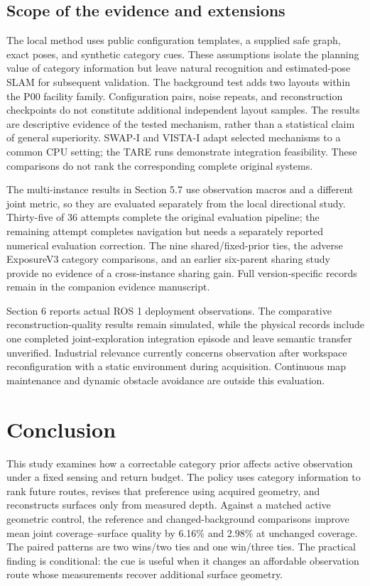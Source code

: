 \documentclass[11pt,a4paper]{article}
\providecommand{\hypertarget}[2]{#2}
\begin{document}
\hypertarget{scope-of-the-evidence-and-extensions}{%
\subsection{Scope of the evidence and extensions}\label{scope-of-the-evidence-and-extensions}}

The local method uses public configuration templates, a supplied safe graph, exact poses, and synthetic category cues. These assumptions isolate the planning value of category information but leave natural recognition and estimated-pose SLAM for subsequent validation. The background test adds two layouts within the P00 facility family. Configuration pairs, noise repeats, and reconstruction checkpoints do not constitute additional independent layout samples. The results are descriptive evidence of the tested mechanism, rather than a statistical claim of general superiority. SWAP-I and VISTA-I adapt selected mechanisms to a common CPU setting; the TARE runs demonstrate integration feasibility. These comparisons do not rank the corresponding complete original systems.

The multi-instance results in Section 5.7 use observation macros and a different joint metric, so they are evaluated separately from the local directional study. Thirty-five of 36 attempts complete the original evaluation pipeline; the remaining attempt completes navigation but needs a separately reported numerical evaluation correction. The nine shared/fixed-prior ties, the adverse ExposureV3 category comparisons, and an earlier six-parent sharing study provide no evidence of a cross-instance sharing gain. Full version-specific records remain in the companion evidence manuscript.

Section 6 reports actual ROS 1 deployment observations. The comparative reconstruction-quality results remain simulated, while the physical records include one completed joint-exploration integration episode and leave semantic transfer unverified. Industrial relevance currently concerns observation after workspace reconfiguration with a static environment during acquisition. Continuous map maintenance and dynamic obstacle avoidance are outside this evaluation.

\hypertarget{conclusion}{%
\section{Conclusion}\label{conclusion}}

This study examines how a correctable category prior affects active observation under a fixed sensing and return budget. The policy uses category information to rank future routes, revises that preference using acquired geometry, and reconstructs surfaces only from measured depth. Against a matched active geometric control, the reference and changed-background comparisons improve mean joint coverage--surface quality by 6.16\% and 2.98\% at unchanged coverage. The paired patterns are two wins/two ties and one win/three ties. The practical finding is conditional: the cue is useful when it changes an affordable observation route whose measurements recover additional surface geometry.
\end{document}
